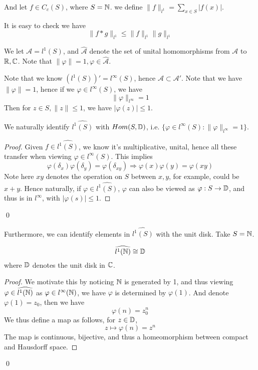 And let $f\in C_c(S)$, where $S=\mathbb{N}$. we define $\|f\|_{l^1}=\sum_{x\in S}|f(x)|$.

It is easy to check we have
\begin{equation*}
    \|f\ast g\|_{l^1}\leq\|f\|_{l^1}\|g\|_{l^1}
\end{equation*}

We let $\mathcal{A}=l^1(S)$, and $\widehat{\mathcal{A}}$ denote the set of unital homomorphisms from $\mathcal{A}$ to $\mathbb{R}, \mathbb{C}$. Note that $\|\varphi\|=1, \varphi\in\widehat{\mathcal{A}}$.

Note that we know $(l^1(S))'=l^\infty(S)$, hence $\widehat{\mathcal{A}}\subset\mathcal{A}'$. Note that we have $\|\varphi\|=1$, hence if we $\varphi\in l^\infty(S)$, we have
\begin{equation*}
    \|\varphi\|_{l^\infty}=1
\end{equation*}
Then for $z\in S, \|z\|\leq 1$, we have $|\varphi(z)|\leq 1$.

\begin{proposition}
    We naturally identify $\widehat{l^1(S)}$ with $Hom(S,\mathbb{D})$, i.e. $\{\varphi\in l^\infty(S): \|\varphi\|_{l^\infty}=1\}$.
\end{proposition}
\begin{proof}
    Given $f\in\widehat{l^1(S)}$, we know it's multiplicative, unital, hence all these transfer when viewing $\varphi\in l^\infty(S)$. This implies
    \begin{equation*}
        \varphi(\delta_x)\varphi(\delta_y)=\varphi(\delta_{xy})\Rightarrow \varphi(x)\varphi(y)=\varphi(xy)
    \end{equation*}
    Note here $xy$ denotes the operation on $S$ between $x,y$, for example, could be $x+y$. Hence naturally, if $\varphi\in\widehat{l^1(S)}$, $\varphi$ can also be viewed as $\varphi: S\to\mathbb{D}$, and thus is in $l^\infty$, with $|\varphi(s)|\leq 1$.
\end{proof}
\qed

Furthermore, we can identify elements in $\widehat{l^1(S)}$ with the unit disk. Take $S=\mathbb{N}$.
\begin{proposition}
    \begin{equation*}
        \widehat{l^1(\mathbb{N})}\cong \mathbb{D}
    \end{equation*}
    where $\mathbb{D}$ denotes the unit disk in $\mathbb{C}$.
\end{proposition}
\begin{proof}
    We motivate this by noticing $\mathbb{N}$ is generated by 1, and thus viewing $\varphi\in\widehat{l^1(\mathbb{N})}$ as $\varphi\in l^\infty(\mathbb{N})$, we have $\varphi$ is determined by $\varphi(1)$. And denote $\varphi(1)=z_0$, then we have
    \begin{equation*}
        \varphi(n)=z_0^n
    \end{equation*}
    We thus define a map as follows, for $z\in\mathbb{D}$, 
    \begin{equation*}
        z\mapsto \varphi(n)=z^n
    \end{equation*}
    The map is continuous, bijective, and thus a homeomorphism between compact and Hausdorff space.
\end{proof}
\qed

